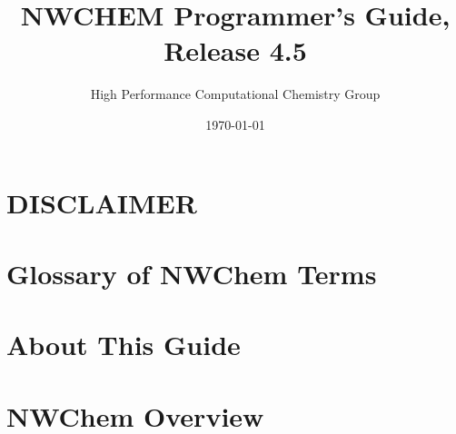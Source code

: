 \setlength{\parskip}{6pt}

\newcommand{\TRUE}{\verb+.true.+}
\newcommand{\FALSE}{\verb+.false.+}
\newcommand{\nwchemversion}{4.5}
\newcommand{\nwchemyear}{2003}



\title{\bf\Large NWCHEM Programmer's Guide, Release \nwchemversion}
\author{High Performance Computational Chemistry Group}
\date{\today}
\maketitle

\chapter*{\center DISCLAIMER}


\chapter*{Glossary of NWChem Terms}


\chapter*{About This Guide}


\clearpage

\tableofcontents

\clearpage

\chapter{NWChem Overview}




